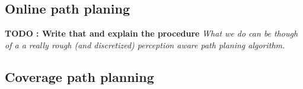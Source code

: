 \documentclass[11pt]{article}
\begin{document}
\subsection{Online path planing}

\textbf{TODO : Write that and explain the procedure} \textit{What we do can be though of a a really rough (and discretized) perception aware path planing algorithm.}

\subsection{Coverage path planning}

\cite{epsilon_star} \cite{Galceran13asurvey} \cite{recsplit}

\tableofcontents

\printbibliography %
\end{document}

